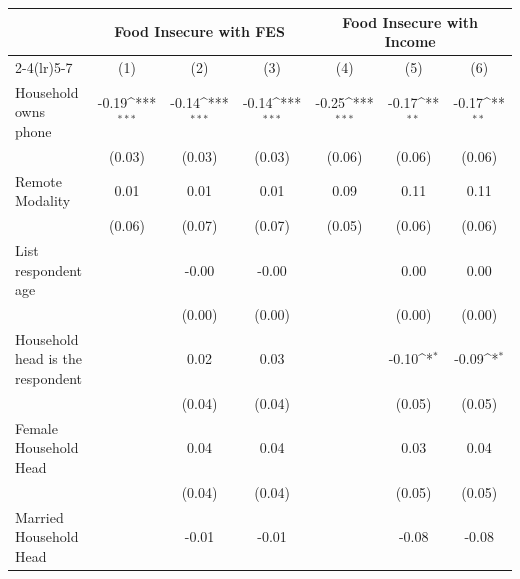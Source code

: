{
\def\sym#1{\ifmmode^{#1}\else\(^{#1}\)\fi}
\begin{tabular}{l*{6}{c}}
\hline\hline
                    &\multicolumn{3}{c}{Food Insecure with FES}                       &\multicolumn{3}{c}{Food Insecure with Income}                    \\\cmidrule(lr){2-4}\cmidrule(lr){5-7}
                    &\multicolumn{1}{c}{(1)}         &\multicolumn{1}{c}{(2)}         &\multicolumn{1}{c}{(3)}         &\multicolumn{1}{c}{(4)}         &\multicolumn{1}{c}{(5)}         &\multicolumn{1}{c}{(6)}         \\
\hline
Household owns phone&       -0.19\sym{***}&       -0.14\sym{***}&       -0.14\sym{***}&       -0.25\sym{***}&       -0.17\sym{**} &       -0.17\sym{**} \\
                    &      (0.03)         &      (0.03)         &      (0.03)         &      (0.06)         &      (0.06)         &      (0.06)         \\
Remote Modality     &        0.01         &        0.01         &        0.01         &        0.09         &        0.11         &        0.11         \\
                    &      (0.06)         &      (0.07)         &      (0.07)         &      (0.05)         &      (0.06)         &      (0.06)         \\
List respondent age &                     &       -0.00         &       -0.00         &                     &        0.00         &        0.00         \\
                    &                     &      (0.00)         &      (0.00)         &                     &      (0.00)         &      (0.00)         \\
Household head is the respondent&                     &        0.02         &        0.03         &                     &       -0.10\sym{*}  &       -0.09\sym{*}  \\
                    &                     &      (0.04)         &      (0.04)         &                     &      (0.05)         &      (0.05)         \\
Female Household Head&                     &        0.04         &        0.04         &                     &        0.03         &        0.04         \\
                    &                     &      (0.04)         &      (0.04)         &                     &      (0.05)         &      (0.05)         \\
Married Household Head&                     &       -0.01         &       -0.01         &                     &       -0.08         &       -0.08         \\

\end{tabular}}

